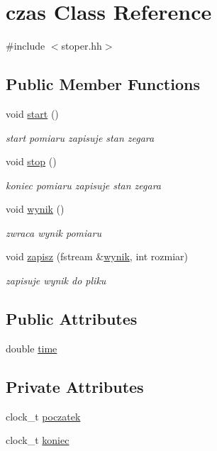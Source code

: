 \hypertarget{classczas}{\section{czas \-Class \-Reference}
\label{classczas}
}


{\ttfamily \#include $<$stoper.\-hh$>$}

\subsection*{\-Public \-Member \-Functions}
\begin{DoxyCompactItemize}
\item 
void \hyperlink{classczas_a1e4c793526806f459e7f5c8c4a3ae29f}{start} ()
\begin{DoxyCompactList}\small\item\em start pomiaru zapisuje stan zegara \end{DoxyCompactList}\item 
void \hyperlink{classczas_a27f391e3c6bfb1f15f97c61bf403eb2d}{stop} ()
\begin{DoxyCompactList}\small\item\em koniec pomiaru zapisuje stan zegara \end{DoxyCompactList}\item 
void \hyperlink{classczas_a579654b3ae8126b00cf4d477f6d18d96}{wynik} ()
\begin{DoxyCompactList}\small\item\em zwraca wynik pomiaru \end{DoxyCompactList}\item 
void \hyperlink{classczas_a53e5d67a7dd77239f2ef6ae0866e0596}{zapisz} (fstream \&\hyperlink{classczas_a579654b3ae8126b00cf4d477f6d18d96}{wynik}, int rozmiar)
\begin{DoxyCompactList}\small\item\em zapisuje wynik do pliku \end{DoxyCompactList}\end{DoxyCompactItemize}
\subsection*{\-Public \-Attributes}
\begin{DoxyCompactItemize}
\item 
double \hyperlink{classczas_a1348fd4948270410b3087bb0318bd147}{time}
\end{DoxyCompactItemize}
\subsection*{\-Private \-Attributes}
\begin{DoxyCompactItemize}
\item 
clock\-\_\-t \hyperlink{classczas_a3e75d47bf9beee497b56997b0b7be45c}{poczatek}
\item 
clock\-\_\-t \hyperlink{classczas_a65324dff284c101f2594b0b05b30399e}{koniec}
\end{DoxyCompactItemize}


